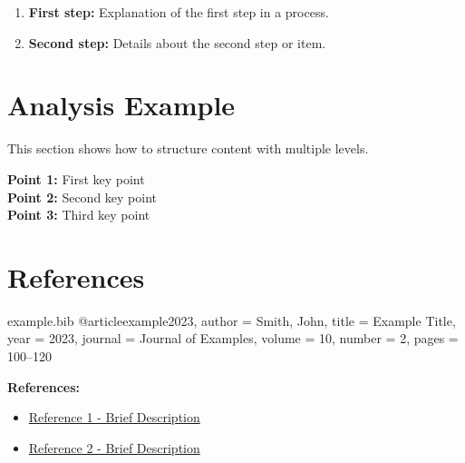 \documentclass[a4paper,11pt]{article}
\begin{document}
\begin{enumerate}
    \item \textbf{First step:} Explanation of the first step in a process.
    
    \item \textbf{Second step:} Details about the second step or item.
\end{enumerate}

\section{Analysis Example}

This section shows how to structure content with multiple levels.

\begin{infobox}[title=Key Points]
\textbf{Point 1:} First key point\\
\textbf{Point 2:} Second key point\\
\textbf{Point 3:} Third key point
\end{infobox}

\section{References}

\begin{filecontents*}{example.bib}
@article{example2023,
  author = {Smith, John},
  title = {Example Title},
  year = {2023},
  journal = {Journal of Examples},
  volume = {10},
  number = {2},
  pages = {100--120}
}
\end{filecontents*}

\textbf{References:}
\begin{itemize}
    \item \href{https://example.com/source1}{Reference 1 - Brief Description}
    \item \href{https://example.com/source2}{Reference 2 - Brief Description}
\end{itemize}


\label{LastPage}
\end{document}
